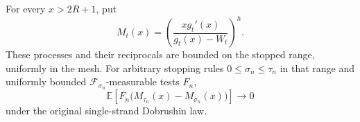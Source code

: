 \begin{lemma}\label{chordal:tests}
For every $x>2R+1$, put
\begin{equation}\label{chordal:martingale}
 M_t(x)=\left(\frac{xg_t'(x)}{g_t(x)-W_t}\right)^h.
\end{equation}
These processes and their reciprocals are bounded on the stopped
range, uniformly in the mesh.  For arbitrary stopping rules
$0\le\sigma_n\le\tau_n$ in that range and uniformly bounded
$\mathcal F_{\sigma_n}$-measurable tests $F_n$,
\begin{equation}\label{chordal:approx-martingale}
 \mathbb E\!\left[F_n\bigl(M_{\tau_n}(x)-M_{\sigma_n}(x)\bigr)\right]
 \longrightarrow0
\end{equation}
under the original single-strand Dobrushin law.
\end{lemma}
